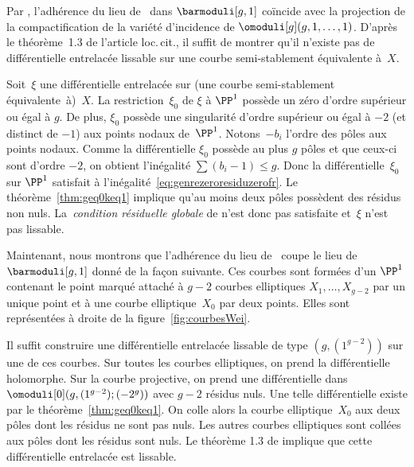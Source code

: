 Par \cite[\S3.6]{BCGGM}, l'adhérence du lieu de \Weierstrass~dans $\barmoduli[g,1]$ coïncide avec la projection de la compactification de la variété d'incidence de $\omoduli[g](g,1,\dots,1)$. D'après le théorème~1.3 de l'article loc.\,cit., il suffit de montrer qu'il n'existe pas de différentielle entrelacée lissable sur une courbe semi-stablement équivalente à~$X$.

Soit~$\xi$ une différentielle entrelacée sur (une courbe semi-stablement équivalente~à)~$X$. La restriction~$\xi_{0}$ de $\xi$ à $\PP^{1}$ possède un zéro d'ordre supérieur ou égal à $g$. De plus, $\xi_{0}$ possède une singularité d'ordre supérieur ou égal à $-2$ (et distinct de $-1$) aux points nodaux de~$\PP^{1}$. Notons~$-b_{i}$ l'ordre des pôles aux points nodaux. Comme la différentielle $\xi_{0}$ possède au plus $g$ pôles et que ceux-ci sont d'ordre $-2$, on obtient l'inégalité $\sum (b_{i}-1) \leq g$. Donc la différentielle~$\xi_{0}$ sur $\PP^{1}$ satisfait à l'inégalité~\eqref{eq:genrezeroresiduzerofr}. Le théorème~\ref{thm:geq0keq1} implique qu'au moins deux pôles possèdent des résidus non nuls. La~\emph{condition résiduelle globale} de \cite[Def.\,1.2]{BCGGM} n'est donc pas satisfaite et~$\xi$ n'est pas lissable.

Maintenant, nous montrons que l'adhérence du lieu de \Weierstrass~coupe le lieu de~$\barmoduli[g,1]$ donné de la façon suivante. Ces courbes sont formées d'un $\PP^{1}$ contenant le point marqué attaché à $g-2$ courbes elliptiques $X_{1},\dots,X_{g-2}$ par un unique point et à une courbe elliptique~$X_{0}$ par deux points. Elles sont représentées à droite de la figure~\ref{fig:courbesWei}.

Il suffit construire une différentielle entrelacée lissable de type $(g,(1^{g-2}))$ sur une de ces courbes. Sur toutes les courbes elliptiques, on prend la différentielle holomorphe. Sur la courbe projective, on prend une différentielle dans $\omoduli[0](g,(1^{g-2});(-2^{g}))$ avec $g-2$ résidus nuls. Une telle différentielle existe par le théorème~\ref{thm:geq0keq1}. On colle alors la courbe elliptique~$X_{0}$ aux deux pôles dont les résidus ne sont pas nuls. Les autres courbes elliptiques sont collées aux pôles dont les résidus sont nuls. Le théorème 1.3 de \cite{BCGGM} implique que cette différentielle entrelacée est lissable.


